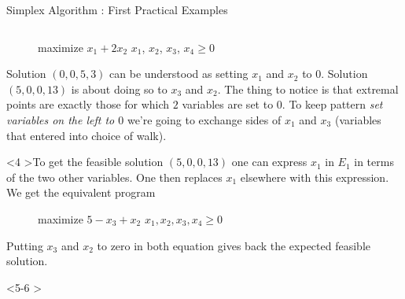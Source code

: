 \documentclass[aspectratio = 169]{beamer}
\begin{document}
\begin{frame}{Simplex Algorithm : First Practical Examples}
\begin{columns}
\begin{column}{.5\textwidth}
\begin{onlyenv}
\begin{figure}
{\begin{linearProg}{
                      maximize
                    }{
                      $x_1 + 2x_2$
                    }{
                    }{
                      $x_1$, $x_2$, $x_3$, $x_4 \geq 0$  
                    }
                  \end{linearProg}
                }
              \end{figure}
              Solution $(0, 0, 5, 3)$ can be understood as setting
              $x_1$ and $x_2$ to $0$. Solution $(5, 0, 0, 13)$ is
              about doing so to $x_3$ and $x_2$. \pause The thing to
              notice is that extremal points are exactly those for
              which $2$ variables are set to $0$. \pause To keep
              pattern \textit{set variables on the left to $0$} we're
              going to exchange sides of $x_1$ and $x_3$ (variables
              that entered into choice of walk).
            \end{onlyenv}            
            \begin{onlyenv}<4
              >To get the feasible solution $(5, 0, 0, 13)$ one can
              express $x_1$ in $E_1$ in terms of the two other
              variables. One then replaces $x_1$ elsewhere with this
              expression. We get the equivalent program
                \begin{figure}
                  \small{
                    \begin{linearProg}{
                        maximize
                      }{
                        $5 - x_3 + x_2$
                      }{
                      }{
                        $x_1, x_2, x_3, x_4 \geq 0$
                      }
                    \end{linearProg}
                  }
                \end{figure}
                Putting $x_3$ and $x_2$ to zero in both equation gives
                back the expected feasible solution.
            \end{onlyenv}
            \begin{onlyenv}<5-6
                >
\end{onlyenv}
\end{column}
\end{columns}
\end{frame}
\end{document}
